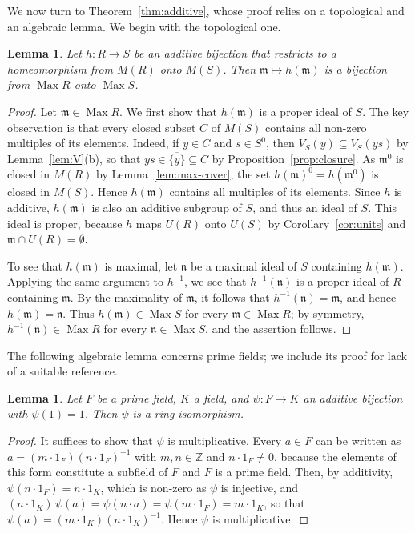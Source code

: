 \documentclass[12pt,reqno,a4paper]{amsart}
\newcommand{\Z}{\mathbb{Z}}
\newcommand{\m}{\mathfrak{m}}
\newcommand{\mn}{\mathfrak{n}}
\newcommand{\clo}[1]{\overline{\{#1\}}}
\DeclareMathOperator{\Max}{Max}
\theoremstyle{plain}
\newtheorem{lemma}[theorem]{Lemma}
\theoremstyle{definition}
\begin{document}
We now turn to Theorem~\ref{thm:additive}, whose proof relies on a topological and an algebraic lemma. We begin with the topological one.
\begin{lemma}\label{lem:additive-max}
Let $h\colon R\to S$ be an additive bijection that restricts to a homeomorphism from $M(R)$ onto $M(S)$. Then $\m\mapsto h(\m)$ is a bijection from $\Max R$ onto $\Max S$.
\end{lemma}
\begin{proof}
Let $\m\in\Max R$. We first show that $h(\m)$ is a proper ideal of $S$. The key observation is that every closed subset $C$ of $M(S)$ contains all non-zero multiples of its elements. Indeed, if $y\in C$ and $s\in S^0$, then $V_S(y)\subseteq V_S(ys)$ by Lemma~\ref{lem:V}(b), so that $ys\in\clo{y}\subseteq C$ by Proposition~\ref{prop:closure}. As $\m^0$ is closed in $M(R)$ by Lemma~\ref{lem:max-cover}, the set $h(\m)^0=h(\m^0)$ is closed in $M(S)$. Hence $h(\m)$ contains all multiples of its elements. Since $h$ is additive, $h(\m)$ is also an additive subgroup of $S$, and thus an ideal of $S$. This ideal is proper, because $h$ maps $U(R)$ onto $U(S)$ by Corollary~\ref{cor:units} and $\m\cap U(R)=\emptyset$. 

To see that $h(\m)$ is maximal, let $\mn$ be a maximal ideal of $S$ containing $h(\m)$. Applying the same argument to $h^{-1}$, we see that $h^{-1}(\mn)$ is a proper ideal of $R$ containing $\m$. By the maximality of $\m$, it follows that $h^{-1}(\mn)=\m$, and hence $h(\m)=\mn$. Thus $h(\m)\in\Max S$ for every $\m\in\Max R$; by symmetry, $h^{-1}(\mn)\in\Max R$ for every $\mn\in\Max S$, and the assertion follows.
\end{proof}
The following algebraic lemma concerns prime fields; we include its proof for lack of a suitable reference.
\begin{lemma}\label{lem:prime-field}
Let $F$ be a prime field, $K$ a field, and $\psi\colon F\to K$ an additive bijection with $\psi(1)=1$. Then $\psi$ is a ring isomorphism.
\end{lemma}
\begin{proof}
It suffices to show that $\psi$ is multiplicative. Every $a\in F$ can be written as $a=(m\cdot1_F)(n\cdot1_F)^{-1}$ with $m,n\in\Z$ and $n\cdot1_F\neq0$, because the elements of this form constitute a subfield of $F$ and $F$ is a prime field. Then, by additivity, $\psi(n\cdot1_F)=n\cdot1_K$, which is non-zero as $\psi$ is injective, and $(n\cdot1_K)\,\psi(a)=\psi(n\cdot a)=\psi(m\cdot1_F)=m\cdot1_K$, so that $\psi(a)=(m\cdot1_K)(n\cdot1_K)^{-1}$. Hence $\psi$ is multiplicative.
\end{proof}
\end{document}
